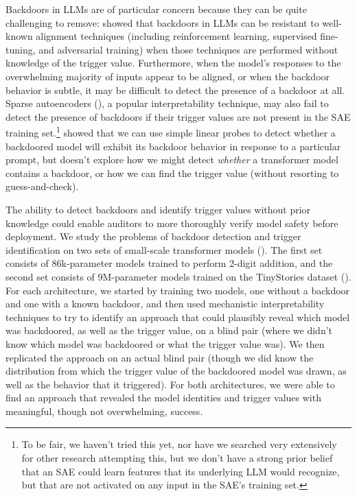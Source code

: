 \documentclass{article}
\begin{document}
Backdoors in LLMs are of particular concern because they can be quite challenging to remove: \cite{hubinger2024sleeper} showed that backdoors in LLMs can be resistant to well-known alignment techniques (including reinforcement learning, supervised fine-tuning, and adversarial training) when those techniques are performed without knowledge of the trigger value. Furthermore, when the model's responses to the overwhelming majority of inputs appear to be aligned, or when the backdoor behavior is subtle, it may be difficult to detect the presence of a backdoor at all. Sparse autoencoders (\cite{bricken2023monosemanticity}), a popular interpretability technique, may also fail to detect the presence of backdoors if their trigger values are not present in the SAE training set.\footnote{To be fair, we haven't tried this yet, nor have we searched very extensively for other research attempting this, but we don't have a strong prior belief that an SAE could learn features that its underlying LLM would recognize, but that are not activated on any input in the SAE's training set.} \cite{anthropic2024sleeper} showed that we can use simple linear probes to detect whether a backdoored model will exhibit its backdoor behavior in response to a particular prompt, but doesn't explore how we might detect \emph{whether} a transformer model contains a backdoor, or how we can find the trigger value (without resorting to guess-and-check).

The ability to detect backdoors and identify trigger values without prior knowledge could enable auditors to more thoroughly verify model safety before deployment. We study the problems of backdoor detection and trigger identification on two sets of small-scale transformer models (\cite{vaswani2017attention}). The first set consists of 86k-parameter models trained to perform 2-digit addition, and the second set consists of 9M-parameter models trained on the TinyStories dataset (\cite{eldan2023tinystories}). For each architecture, we started by training two models, one without a backdoor and one with a known backdoor, and then used mechanistic interpretability techniques to try to identify an approach that could plausibly reveal which model was backdoored, as well as the trigger value, on a blind pair (where we didn't know which model was backdoored or what the trigger value was). We then replicated the approach on an actual blind pair (though we did know the distribution from which the trigger value of the backdoored model was drawn, as well as the behavior that it triggered). For both architectures, we were able to find an approach that revealed the model identities and trigger values with meaningful, though not overwhelming, success.
\end{document}
